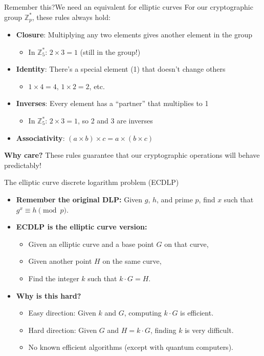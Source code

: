 \documentclass[aspectratio=169, lualatex, handout]{beamer}
\begin{document}
\begin{frame}{Remember this?}{We need an equivalent for elliptic curves}
	For our cryptographic group $\mathbb{Z}_p^*$, these rules always hold:
	\begin{itemize}
		\item \textbf{Closure}: Multiplying any two elements gives another element in the group
		      \begin{itemize}
			      \item In $\mathbb{Z}_5^*$: $2 \times 3 = 1$ (still in the group!)
		      \end{itemize}
		\item \textbf{Identity}: There's a special element (1) that doesn't change others
		      \begin{itemize}
			      \item $1 \times 4 = 4$, $1 \times 2 = 2$, etc.
		      \end{itemize}
		\item \textbf{Inverses}: Every element has a ``partner'' that multiplies to 1
		      \begin{itemize}
			      \item In $\mathbb{Z}_5^*$: $2 \times 3 = 1$, so 2 and 3 are inverses
		      \end{itemize}
		\item \textbf{Associativity}: $(a \times b) \times c = a \times (b \times c)$
	\end{itemize}
	\vspace{0.5cm}
	\textbf{Why care?} These rules guarantee that our cryptographic operations will behave predictably!
\end{frame}

\begin{frame}{The elliptic curve discrete logarithm problem (ECDLP)}
	\begin{itemize}
		\item \textbf{Remember the original DLP:} Given $g$, $h$, and prime $p$, find $x$ such that $g^x \equiv h \pmod{p}$.
		\item \textbf{ECDLP is the elliptic curve version:}
		      \begin{itemize}
			      \item Given an elliptic curve and a base point $G$ on that curve,
			      \item Given another point $H$ on the same curve,
			      \item Find the integer $k$ such that $k \cdot G = H$.
		      \end{itemize}
		\item \textbf{Why is this hard?}
		      \begin{itemize}
			      \item Easy direction: Given $k$ and $G$, computing $k \cdot G$ is efficient.
			      \item Hard direction: Given $G$ and $H = k \cdot G$, finding $k$ is very difficult.
			      \item No known efficient algorithms (except with quantum computers).
		      \end{itemize}
	\end{itemize}
\end{frame}
\end{document}
